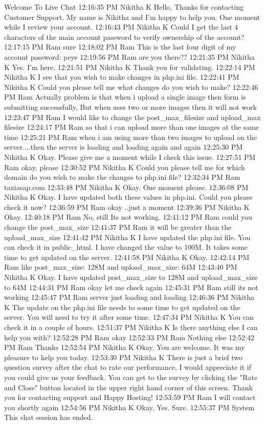 {{{{Welcome To Live Chat
12:16:35 PM
Nikitha K
Hello, Thanks for contacting Customer Support. My name is Nikitha and I'm happy to help you. One moment while I review your account.
12:16:43 PM
Nikitha K
Could I get the last 4 characters of the main account password to verify ownership of the account?
12:17:15 PM
Ram
sure
12:18:02 PM
Ram
This is the last four digit of my account password: peye
12:19:56 PM
Ram
are you there??
12:21:35 PM
Nikitha K
Yes. I'm here.
12:21:51 PM
Nikitha K
Thank you for validating.
12:22:14 PM
Nikitha K
I see that you wish to make changes in php.ini file.
12:22:41 PM
Nikitha K
Could you please tell me what changes do you wish to make?
12:22:46 PM
Ram
Actually problem is that when i upload a single image then form is submitting successfully, But when uses two or more images then it will not work
12:23:47 PM
Ram
I would like to change the post_max_filesize and upload_max filesize
12:24:17 PM
Ram
so that i can upload more than one images at the same time
12:25:21 PM
Ram
when i am using more than two images to upload on the server....then the server is loading and loading again and again
12:25:30 PM
Nikitha K
Okay. Please give me a moment while I check this issue.
12:27:51 PM
Ram
okay, please
12:30:52 PM
Nikitha K
Could you please tell me for which domain do you wish to make the changes to php.ini file?
12:32:34 PM
Ram
taxiasap.com
12:33:48 PM
Nikitha K
Okay. One moment please.
12:36:08 PM
Nikitha K
Okay. I have updated both these values in php.ini. Could you please check it now?
12:36:59 PM
Ram
okay ..just a moment
12:39:36 PM
Nikitha K
Okay.
12:40:18 PM
Ram
No, still Its not working.
12:41:12 PM
Ram
could you change the post_max_size
12:41:37 PM
Ram
it will be greater than the upload_max_size
12:41:42 PM
Nikitha K
I have updated the php.ini file. You can check it in public_html. I have changed the value to 100M. It takes some time to get updated on the server.
12:41:58 PM
Nikitha K
Okay.
12:42:14 PM
Ram
like post_max_size: 128M and upload_max_size: 64M
12:43:40 PM
Nikitha K
Okay. I have updated post_max_size to 128M and upload_max_size to 64M
12:44:31 PM
Ram
okay let me check again
12:45:31 PM
Ram
still its not working
12:45:47 PM
Ram
server just loading and loading
12:46:36 PM
Nikitha K
The update on the php.ini file needs to some time to get updated on the server. You will need to try it after some time.
12:47:34 PM
Nikitha K
You can check it in a couple of hours.
12:51:37 PM
Nikitha K
Is there anything else I can help you with?
12:52:28 PM
Ram
okay
12:52:33 PM
Ram
Nothing else
12:52:42 PM
Ram
Thanks
12:52:54 PM
Nikitha K
Okay. You are welcome. It was my pleasure to help you today.
12:53:30 PM
Nikitha K
There is just a brief two question survey after the chat to rate our performance, I would appreciate it if you could give us your feedback. You can get to the survey by clicking the "Rate and Close" button located in the upper right hand corner of this screen. Thank you for contacting support and Happy Hosting!
12:53:59 PM
Ram
I will contact you shortly again
12:54:56 PM
Nikitha K
Okay. Yes. Sure.
12:55:37 PM
System
This chat session has ended.


}}}}
